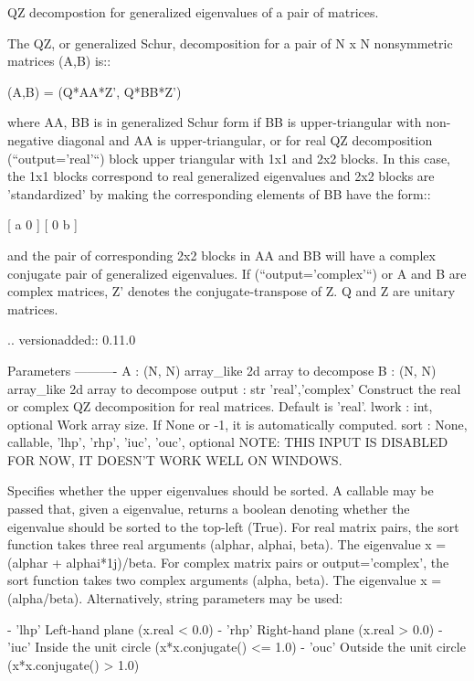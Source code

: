 \begin{DoxyVerb}QZ decompostion for generalized eigenvalues of a pair of matrices.

The QZ, or generalized Schur, decomposition for a pair of N x N
nonsymmetric matrices (A,B) is::

    (A,B) = (Q*AA*Z', Q*BB*Z')

where AA, BB is in generalized Schur form if BB is upper-triangular
with non-negative diagonal and AA is upper-triangular, or for real QZ
decomposition (``output='real'``) block upper triangular with 1x1
and 2x2 blocks.  In this case, the 1x1 blocks correspond to real
generalized eigenvalues and 2x2 blocks are 'standardized' by making
the corresponding elements of BB have the form::

    [ a 0 ]
    [ 0 b ]

and the pair of corresponding 2x2 blocks in AA and BB will have a complex
conjugate pair of generalized eigenvalues.  If (``output='complex'``) or
A and B are complex matrices, Z' denotes the conjugate-transpose of Z.
Q and Z are unitary matrices.

.. versionadded:: 0.11.0

Parameters
----------
A : (N, N) array_like
    2d array to decompose
B : (N, N) array_like
    2d array to decompose
output : str {'real','complex'}
    Construct the real or complex QZ decomposition for real matrices.
    Default is 'real'.
lwork : int, optional
    Work array size.  If None or -1, it is automatically computed.
sort : {None, callable, 'lhp', 'rhp', 'iuc', 'ouc'}, optional
    NOTE: THIS INPUT IS DISABLED FOR NOW, IT DOESN'T WORK WELL ON WINDOWS.

    Specifies whether the upper eigenvalues should be sorted.  A callable
    may be passed that, given a eigenvalue, returns a boolean denoting
    whether the eigenvalue should be sorted to the top-left (True). For
    real matrix pairs, the sort function takes three real arguments
    (alphar, alphai, beta). The eigenvalue x = (alphar + alphai*1j)/beta.
    For complex matrix pairs or output='complex', the sort function
    takes two complex arguments (alpha, beta). The eigenvalue
    x = (alpha/beta).
    Alternatively, string parameters may be used:

        - 'lhp'   Left-hand plane (x.real < 0.0)
        - 'rhp'   Right-hand plane (x.real > 0.0)
        - 'iuc'   Inside the unit circle (x*x.conjugate() <= 1.0)
        - 'ouc'   Outside the unit circle (x*x.conjugate() > 1.0)


\end{DoxyVerb}
